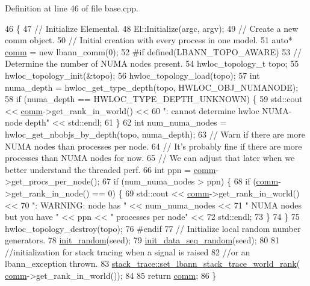 Definition at line 46 of file base.\+cpp.


\begin{DoxyCode}
46                                                           \{
47   \textcolor{comment}{// Initialize Elemental.}
48   El::Initialize(argc, argv);
49   \textcolor{comment}{// Create a new comm object.}
50   \textcolor{comment}{// Initial creation with every process in one model.}
51   \textcolor{keyword}{auto}* \hyperlink{file__io_8cpp_ab048c6f9fcbcfaa57ce68b00263dbebe}{comm} = \textcolor{keyword}{new} lbann\_comm(0);
52 \textcolor{preprocessor}{#if defined(LBANN\_TOPO\_AWARE)}
53   \textcolor{comment}{// Determine the number of NUMA nodes present.}
54   hwloc\_topology\_t topo;
55   hwloc\_topology\_init(&topo);
56   hwloc\_topology\_load(topo);
57   \textcolor{keywordtype}{int} numa\_depth = hwloc\_get\_type\_depth(topo, HWLOC\_OBJ\_NUMANODE);
58   \textcolor{keywordflow}{if} (numa\_depth == HWLOC\_TYPE\_DEPTH\_UNKNOWN) \{
59     std::cout << \hyperlink{file__io_8cpp_ab048c6f9fcbcfaa57ce68b00263dbebe}{comm}->get\_rank\_in\_world() <<
60               \textcolor{stringliteral}{": cannot determine hwloc NUMA-node depth"} << std::endl;
61   \}
62   \textcolor{keywordtype}{int} num\_numa\_nodes = hwloc\_get\_nbobjs\_by\_depth(topo, numa\_depth);
63   \textcolor{comment}{// Warn if there are more NUMA nodes than processes per node.}
64   \textcolor{comment}{// It's probably fine if there are more processes than NUMA nodes for now.}
65   \textcolor{comment}{// We can adjust that later when we better understand the threaded perf.}
66   \textcolor{keywordtype}{int} ppn = \hyperlink{file__io_8cpp_ab048c6f9fcbcfaa57ce68b00263dbebe}{comm}->get\_procs\_per\_node();
67   \textcolor{keywordflow}{if} (num\_numa\_nodes > ppn) \{
68     \textcolor{keywordflow}{if} (\hyperlink{file__io_8cpp_ab048c6f9fcbcfaa57ce68b00263dbebe}{comm}->get\_rank\_in\_node() == 0) \{
69       std::cout << \hyperlink{file__io_8cpp_ab048c6f9fcbcfaa57ce68b00263dbebe}{comm}->get\_rank\_in\_world() <<
70                 \textcolor{stringliteral}{": WARNING: node has "} << num\_numa\_nodes <<
71                 \textcolor{stringliteral}{" NUMA nodes but you have "} << ppn << \textcolor{stringliteral}{" processes per node"} <<
72                 std::endl;
73     \}
74   \}
75   hwloc\_topology\_destroy(topo);
76 \textcolor{preprocessor}{#endif}
77   \textcolor{comment}{// Initialize local random number generators.}
78   \hyperlink{namespacelbann_acef152f20e422b3aea1a3c1691a533ac}{init\_random}(seed);
79   \hyperlink{namespacelbann_a8987701a637ff0e678114aa77e9c4d40}{init\_data\_seq\_random}(seed);
80 
81   \textcolor{comment}{//initialization for stack tracing when a signal is raised}
82   \textcolor{comment}{//or an lbann\_exception thrown.}
83   \hyperlink{namespacelbann_1_1stack__trace_a1063a9a501d78a7525224461e155a483}{stack\_trace::set\_lbann\_stack\_trace\_world\_rank}(
      \hyperlink{file__io_8cpp_ab048c6f9fcbcfaa57ce68b00263dbebe}{comm}->get\_rank\_in\_world());
84 
85   \textcolor{keywordflow}{return} \hyperlink{file__io_8cpp_ab048c6f9fcbcfaa57ce68b00263dbebe}{comm};
86 \}
\end{DoxyCode}
